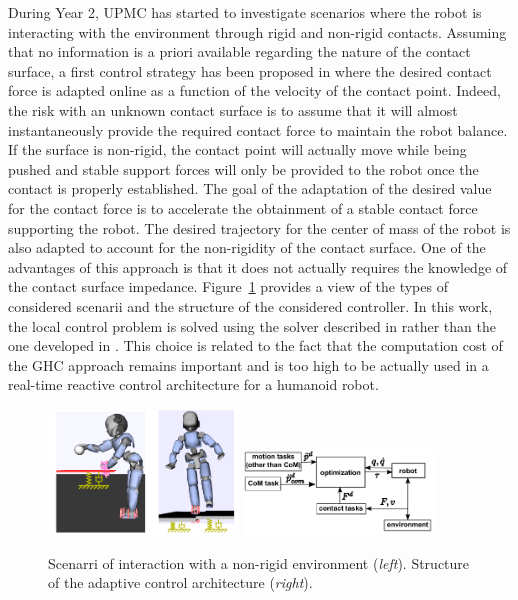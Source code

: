 During Year 2, UPMC has started to investigate scenarios where the robot is interacting with the environment through rigid and non-rigid contacts. Assuming that no information is a priori available regarding the nature of the contact surface, a first control strategy has been proposed in \cite{LiuIROS2015} where the desired contact force is adapted online as a function of the velocity of the contact point. Indeed, the risk with an unknown contact surface is to assume that it will almost instantaneously provide the required contact force to maintain the robot balance. If the surface is non-rigid, the contact point will actually move while being pushed and stable support forces will only be provided to the robot once the contact is properly established. The goal of the adaptation of the desired value for the contact force is to accelerate the obtainment of a stable contact force supporting the robot. The desired trajectory for the center of mass of the robot is also adapted to account for the non-rigidity of the contact surface. One of the advantages of this approach is that it does not actually requires the knowledge of the contact surface impedance. Figure~\ref{fig:LIU_IROS_2015} provides a view of the types of considered scenarii and the structure of the considered controller. In this work, the local control problem is solved using the solver described in \cite{salini2012} rather than the one developed in \cite{LiuGHC}. This choice is related to the fact that the computation cost of the GHC approach remains important and is too high to be actually used in a real-time reactive control architecture for a humanoid robot.\\

\begin{figure}[h!]
\centering
\includegraphics[width=0.45\textwidth]{images/LIU_IROS_2015} \includegraphics[width=0.45\textwidth]{images/LIU_IROS_2015_bis}
\caption{Scenarri of interaction with a non-rigid environment (\textit{left}). Structure of the adaptive control architecture (\textit{right}).}
\label{fig:LIU_IROS_2015}
\end{figure}

